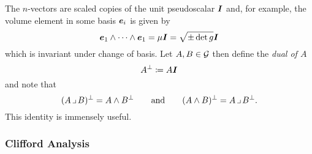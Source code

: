 \documentclass{article}
\begin{document}
The $n$-vectors are scaled copies of the unit pseudoscalar $\boldsymbol{I}$ and, for example, the volume element in some basis $\boldsymbol{e}_i$ is given by
\begin{equation}
    \boldsymbol{e}_1 \wedge \cdots \wedge \boldsymbol{e}_1 = \mu \boldsymbol{I} = \sqrt{\pm \det g} \boldsymbol{I}
\end{equation}
which is invariant under change of basis. Let $A, B \in \mathcal{G}$ then define the \emph{dual of $A$}
\begin{equation}
A^\perp \coloneqq A\boldsymbol{I}
\end{equation}
and note that
\begin{equation}
(A\hspace*{.5mm} \lrcorner \hspace*{.5mm} B)^\perp = A\wedge B^\perp \qquad \textrm{and}\qquad (A\wedge B)^\perp = A\hspace*{.5mm} \lrcorner \hspace*{.5mm} B^\perp.
\end{equation}
This identity is immensely useful.


\subsubsection{Clifford Analysis}
\end{document}
